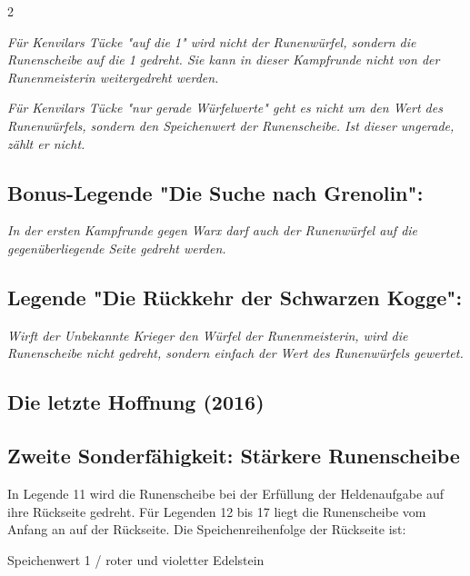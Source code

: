\documentclass[10pt, a4paper, oneside]{book}
\newcommand{\fan}[1]{\textit{#1}}
\begin{document}
\begin{multicols*}{2}
\begin{bgcolor}
\fan{Für Kenvilars Tücke "auf die 1" wird nicht der Runenwürfel, sondern die Runenscheibe auf die 1 gedreht. Sie kann in dieser Kampfrunde nicht von der Runenmeisterin weitergedreht werden.}
\supercite{15179}

\fan{Für Kenvilars Tücke "nur gerade Würfelwerte" geht es nicht um den Wert des Runenwürfels, sondern den Speichenwert der Runenscheibe. Ist dieser ungerade, zählt er nicht.}



\subsection{Bonus-Legende "Die Suche nach Grenolin":}

\fan{In der ersten Kampfrunde gegen Warx darf auch der Runenwürfel auf die gegenüberliegende Seite gedreht werden.}



\subsection{Legende "Die Rückkehr der Schwarzen Kogge":}

\fan{Wirft der Unbekannte Krieger den Würfel der Runenmeisterin, wird die Runenscheibe nicht gedreht, sondern einfach der Wert des Runenwürfels gewertet.}

\end{bgcolor}



\columnbreak


\begin{bgcolor}
\section{Die letzte Hoffnung (2016)}


\subsection{Zweite Sonderfähigkeit: Stärkere Runenscheibe}

In Legende 11 wird die Runenscheibe bei der Erfüllung der Heldenaufgabe auf ihre Rückseite gedreht.\supercite{mh11-heldenkarte-runenmeisterin} Für Legenden 12 bis 17 liegt die Runenscheibe vom Anfang an auf der Rückseite.\supercite{mh-begleitheft} Die Speichenreihenfolge der Rückseite ist:

\bullet{} Speichenwert 1 / roter und violetter Edelstein


\end{bgcolor}
\end{multicols*}
\end{document}
